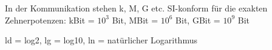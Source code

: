 \begin{remark}
    In der Kommunikation stehen k, M, G etc. SI-konform für die exakten Zehnerpotenzen:
        kBit = $10^3$ Bit, MBit = $10^6$ Bit, GBit = $10^9$ Bit

        {\small ld = log2, lg = log10, ln = natürlicher Logarithmus}
\end{remark}





